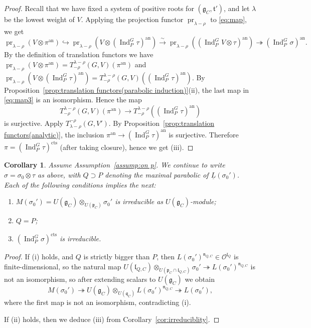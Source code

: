 \documentclass[a4paper]{amsart}
\numberwithin{equation}{section}
\newtheorem{cor}[thm]{Corollary}
\theoremstyle{remark}
\theoremstyle{definition}
\DeclareMathOperator{\Ind}{Ind}
\DeclareMathOperator{\pr}{pr}
\newcommand{\an}{\mathrm{an}}
\newcommand{\cts}{\mathrm{cts}}
\newcommand{\congto}{\xrightarrow{\,\sim\,}}
\newcommand{\into}{\hookrightarrow}
\newcommand{\onto}{\twoheadrightarrow}
\newcommand{\un}[1]{\underline{#1}}
\begin{document}
\begin{proof}
  Recall that we have fixed a system of positive roots for $(\mathfrak{g}_{C},\mathfrak{t}')$, and let $\lambda$ be the lowest weight of $V$.
  Applying the projection functor $\pr_{\lambda - \rho}$ to \eqref{eq:map}, we get
  \begin{equation}\label{eq:map3}
    \pr_{\lambda - \rho}(V \otimes \pi^\an) \into \pr_{\lambda - \rho}(V \otimes (\Ind_P^G \tau)^\an) \congto \pr_{\lambda - \rho}((\Ind_P^G V \otimes \tau)^\an) \onto (\Ind_P^G \sigma)^\an.
  \end{equation}
  By the definition of translation functors we have $\pr_{\lambda - \rho}(V \otimes \pi^\an) = T_{-\rho}^{\lambda - \rho}(G,V)(\pi^{\an})$ and $\pr_{\lambda - \rho}(V \otimes (\Ind_P^G \tau)^\an) = T_{-\rho}^{\lambda - \rho}(G,V)((\Ind_P^G \tau)^{\an})$.
  By Proposition~\ref{prop:translation functors(parabolic induction)}(ii), the last map in \eqref{eq:map3} is an isomorphism.
  Hence the map
  \[
    T_{-\rho}^{\lambda - \rho}(G,V)(\pi^{\an})\to T_{-\rho}^{\lambda - \rho}((\Ind_P^G \tau)^{\an})
  \]
  is surjective.
  Apply $T_{\lambda - \rho}^{-\rho}(G,V')$.
  By Proposition~\ref{prop:translation functors(analytic)}, the inclusion $\pi^{\an}\to (\Ind_P^G \tau)^{\an}$ is surjective.
  Therefore $\pi = (\Ind_{P}^{G}\tau)^{\cts}$ (after taking closure), hence we get (iii).
\end{proof}


\begin{cor}\label{cor:criterion-easy-cases}
  Assume Assumption~\ref{assump:on p}.
  We continue to write $\sigma = \sigma_0 \otimes \tau$ as above, with $Q \supset P$ denoting the maximal parabolic of $\un L(\sigma_0')$.
  Each of the following conditions implies the next:
  \begin{enumerate}
  \item $M(\sigma_0') = U(\mathfrak g_C) \otimes_{U(\mathfrak p_C)} \sigma_0'$ is irreducible as $U(\mathfrak g_C)$-module;
  \item $Q = P$;
  \item $(\Ind_P^G \sigma)^\cts$ is irreducible.
  \end{enumerate}
\end{cor}

\begin{proof}
  If (i) holds, and $Q$ is strictly bigger than $P$, then $L(\sigma_0')^{\mathfrak n_{Q,C}} \in \mathcal O^{\mathfrak l_{Q}}$ is finite-dimensional, so the natural map
  $U(\mathfrak l_{Q,C}) \otimes_{U(\mathfrak p_C \cap \mathfrak l_{Q,C})} \sigma_0' \onto L(\sigma_0')^{\mathfrak n_{Q,C}}$
  is not an isomorphism, so after extending scalars to $U(\mathfrak g_C)$ we obtain
  \[M(\sigma_0') \onto U(\mathfrak g_C) \otimes_{U(\mathfrak q_C)} L(\sigma_0')^{\mathfrak n_{Q,C}} \onto L(\sigma_0'),\]
  where the first map is not an isomorphism, contradicting (i).

  If (ii) holds, then we deduce (iii) from Corollary~\ref{cor:irreduciblity}.
\end{proof}
\end{document}
